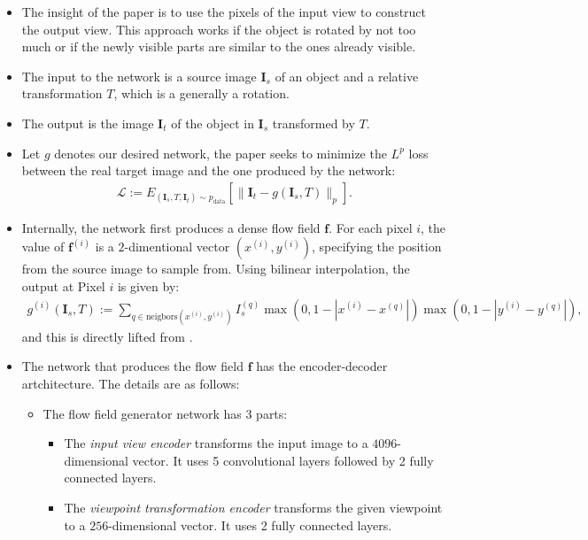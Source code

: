 \documentclass[10pt]{article}
\newcommand{\ve}[1]{\pmb{#1}}
\newcommand{\mc}[1]{\mathcal{#1}}
\newcommand{\mrm}[1]{\mathrm{#1}}
\begin{document}
  \begin{itemize}
  	\item The insight of the paper is to use the pixels of the input view to construct the output view. This approach works if the object is rotated by not too much or if the newly visible parts are similar to the ones already visible.

  	\item The input to the network is a source image $\ve{I}_s$ of an object and a relative transformation $T$, which is a generally a rotation.

  	\item The output is the image $\ve{I}_t$ of the object in $\ve{I}_s$ transformed by $T$.

  	\item Let $g$ denotes our desired network, the paper seeks to minimize the $L^p$ loss between the real target image and the one produced by the network:
  	\begin{align*}
  		\mc{L} := E_{(\ve{I}_s, T, \ve{I}_t) \sim p_{\mrm{data}}} [ \| \ve{I}_t - g(\ve{I}_s, T) \|_p ].
  	\end{align*}

  	\item Internally, the network first produces a dense flow field $\ve{f}$. For each pixel $i$, the value of $\ve{f}^{(i)}$ is a $2$-dimentional vector $(x^{(i)}, y^{(i)})$, specifying the position from the source image to sample from. Using bilinear interpolation, the output at Pixel $i$ is given by:
  	\begin{align*}
  		g^{(i)}(\ve{I}_s, T) 
  		:= \sum_{q \in \mrm{neigbors}(x^{(i)}, y^{(i)})}
  		I^{(q)}_s 
  		\max(0, 1-|x^{(i)} - x^{(q)}|)
  		\max(0, 1-|y^{(i)} - y^{(q)}|),
  	\end{align*}
  	and this is directly lifted from \cite{Zhou:2016}.

  	\item The network that produces the flow field $\ve{f}$ has the encoder-decoder artchitecture. The details are as follows:
  	\begin{itemize}
  		\item The flow field generator network has 3 parts:
  		\begin{itemize}
	  		\item The \emph{input view encoder} transforms the input image to a $4096$-dimensional vector. It uses 5 convolutional layers followed by 2 fully connected layers.

	  		\item The \emph{viewpoint transformation encoder} transforms the given viewpoint to a $256$-dimensional vector. It uses 2 fully connected layers.


\end{itemize}
\end{itemize}
\end{itemize}
\end{document}
